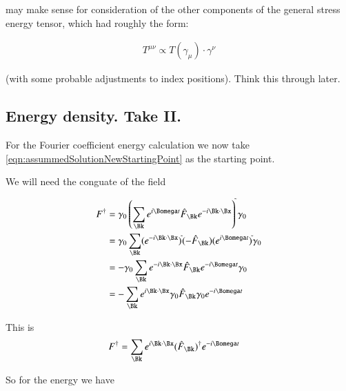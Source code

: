 \documentclass{article}
\begin{document}
may make sense for consideration of the other components of the general stress energy tensor, which had roughly the form:

\begin{align*}
T^{\mu\nu} \propto T(\gamma_\mu) \cdot \gamma^\nu
\end{align*}

(with some probable adjustments to index positions).  Think this through later.

\subsection{ Energy density. Take II. }

For the Fourier coefficient energy calculation we now take \ref{eqn:assummedSolutionNewStartingPoint} as the starting point.

We will need the conguate of the field

\begin{align*}
F^\dagger 
&= \gamma_0 
\left(
\sum_{\Bk} 
e^{i \Bomega t}
\hat{F}_{\Bk}
e^{-i \Bk \cdot \Bx}
\right)
^{\tilde{}}
\gamma_0 \\
&= \gamma_0 \sum_{\Bk} 
(e^{-i \Bk \cdot \Bx})^{\tilde{}}
(-\hat{F}_{\Bk})
(e^{i \Bomega t})^{\tilde{}}
\gamma_0 \\
&= -\gamma_0 \sum_{\Bk} 
e^{-i \Bk \cdot \Bx}
\hat{F}_{\Bk}
e^{-i \Bomega t}
\gamma_0 \\
&= -\sum_{\Bk} 
e^{i \Bk \cdot \Bx}
\gamma_0
\hat{F}_{\Bk}
\gamma_0
e^{-i \Bomega t}
\\
\end{align*}

This is
\begin{align}\label{eqn:conjugateField}
F^\dagger 
&= \sum_{\Bk} 
e^{i \Bk \cdot \Bx}
(\hat{F}_{\Bk})^{\dagger}
e^{-i \Bomega t}
\end{align}

So for the energy we have
\end{document}
